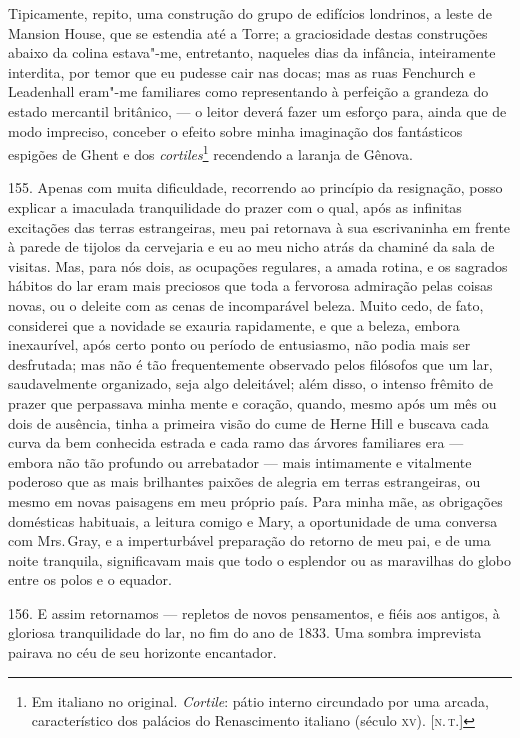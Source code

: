 Tipicamente, repito, uma construção do grupo de edifícios londrinos, a
leste de Mansion House, que se estendia até a Torre; a graciosidade
destas construções abaixo da colina estava"-me, entretanto, naqueles dias
da infância, inteiramente interdita, por temor que eu pudesse cair nas
docas; mas as ruas Fenchurch e Leadenhall eram"-me familiares como
representando à perfeição a grandeza do estado mercantil britânico, --- o
leitor deverá fazer um esforço para, ainda que de modo impreciso,
conceber o efeito sobre minha imaginação dos fantásticos espigões de
Ghent e dos \emph{cortiles}\footnote{Em italiano no original.
  \emph{Cortile}: pátio interno circundado por uma arcada,
  característico dos palácios do Renascimento italiano (século \textsc{xv}).
  {[}\textsc{n.\,t.}{]}} recendendo a laranja de Gênova.

155. Apenas com muita dificuldade, recorrendo ao princípio da
resignação, posso explicar a imaculada tranquilidade do prazer com o
qual, após as infinitas excitações das terras estrangeiras, meu pai
retornava à sua escrivaninha em frente à parede de tijolos da cervejaria
e eu ao meu nicho atrás da chaminé da sala de visitas. Mas, para nós
dois, as ocupações regulares, a amada rotina, e os sagrados hábitos do
lar eram mais preciosos que toda a fervorosa admiração pelas coisas
novas, ou o deleite com as cenas de incomparável beleza. Muito cedo, de
fato, considerei que a novidade se exauria rapidamente, e que a beleza,
embora inexaurível, após certo ponto ou período de entusiasmo, não podia
mais ser desfrutada; mas não é tão frequentemente observado pelos
filósofos que um lar, saudavelmente organizado, seja algo deleitável;
além disso, o intenso frêmito de prazer que perpassava minha mente e
coração, quando, mesmo após um mês ou dois de ausência, tinha a primeira
visão do cume de Herne Hill e buscava cada curva da bem conhecida
estrada e cada ramo das árvores familiares era --- embora não tão
profundo ou arrebatador --- mais intimamente e vitalmente poderoso que as
mais brilhantes paixões de alegria em terras estrangeiras, ou mesmo em
novas paisagens em meu próprio país. Para minha mãe, as obrigações
domésticas habituais, a leitura comigo e Mary, a oportunidade de uma
conversa com Mrs.\,Gray, e a imperturbável preparação do retorno de meu
pai, e de uma noite tranquila, significavam mais que todo o esplendor ou
as maravilhas do globo entre os polos e o equador.

156. E assim retornamos --- repletos de novos pensamentos, e fiéis aos
antigos, à gloriosa tranquilidade do lar, no fim do ano de 1833. Uma
sombra imprevista pairava no céu de seu horizonte encantador.

